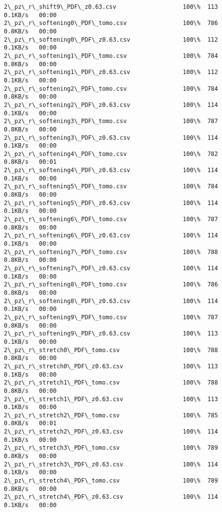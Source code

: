 \documentclass[11pt]{article}
\begin{document}
\begin{Verbatim}[commandchars=\\\{\}]
2\_pz\_r\_shift9\_PDF\_z0.63.csv                   100\%  113     0.1KB/s   00:00    
2\_pz\_r\_softening0\_PDF\_tomo.csv                100\%  786     0.8KB/s   00:00    
2\_pz\_r\_softening0\_PDF\_z0.63.csv               100\%  112     0.1KB/s   00:00    
2\_pz\_r\_softening1\_PDF\_tomo.csv                100\%  784     0.8KB/s   00:00    
2\_pz\_r\_softening1\_PDF\_z0.63.csv               100\%  112     0.1KB/s   00:00    
2\_pz\_r\_softening2\_PDF\_tomo.csv                100\%  784     0.8KB/s   00:00    
2\_pz\_r\_softening2\_PDF\_z0.63.csv               100\%  114     0.1KB/s   00:00    
2\_pz\_r\_softening3\_PDF\_tomo.csv                100\%  787     0.8KB/s   00:00    
2\_pz\_r\_softening3\_PDF\_z0.63.csv               100\%  114     0.1KB/s   00:00    
2\_pz\_r\_softening4\_PDF\_tomo.csv                100\%  782     0.8KB/s   00:01    
2\_pz\_r\_softening4\_PDF\_z0.63.csv               100\%  114     0.1KB/s   00:00    
2\_pz\_r\_softening5\_PDF\_tomo.csv                100\%  784     0.8KB/s   00:00    
2\_pz\_r\_softening5\_PDF\_z0.63.csv               100\%  114     0.1KB/s   00:00    
2\_pz\_r\_softening6\_PDF\_tomo.csv                100\%  787     0.8KB/s   00:00    
2\_pz\_r\_softening6\_PDF\_z0.63.csv               100\%  114     0.1KB/s   00:00    
2\_pz\_r\_softening7\_PDF\_tomo.csv                100\%  788     0.8KB/s   00:00    
2\_pz\_r\_softening7\_PDF\_z0.63.csv               100\%  114     0.1KB/s   00:00    
2\_pz\_r\_softening8\_PDF\_tomo.csv                100\%  786     0.8KB/s   00:00    
2\_pz\_r\_softening8\_PDF\_z0.63.csv               100\%  114     0.1KB/s   00:00    
2\_pz\_r\_softening9\_PDF\_tomo.csv                100\%  787     0.8KB/s   00:00    
2\_pz\_r\_softening9\_PDF\_z0.63.csv               100\%  113     0.1KB/s   00:00    
2\_pz\_r\_stretch0\_PDF\_tomo.csv                  100\%  788     0.8KB/s   00:00    
2\_pz\_r\_stretch0\_PDF\_z0.63.csv                 100\%  113     0.1KB/s   00:00    
2\_pz\_r\_stretch1\_PDF\_tomo.csv                  100\%  788     0.8KB/s   00:00    
2\_pz\_r\_stretch1\_PDF\_z0.63.csv                 100\%  113     0.1KB/s   00:00    
2\_pz\_r\_stretch2\_PDF\_tomo.csv                  100\%  785     0.8KB/s   00:01    
2\_pz\_r\_stretch2\_PDF\_z0.63.csv                 100\%  114     0.1KB/s   00:00    
2\_pz\_r\_stretch3\_PDF\_tomo.csv                  100\%  789     0.8KB/s   00:00    
2\_pz\_r\_stretch3\_PDF\_z0.63.csv                 100\%  114     0.1KB/s   00:00    
2\_pz\_r\_stretch4\_PDF\_tomo.csv                  100\%  789     0.8KB/s   00:00    
2\_pz\_r\_stretch4\_PDF\_z0.63.csv                 100\%  114     0.1KB/s   00:00    

\end{Verbatim}
\end{document}
